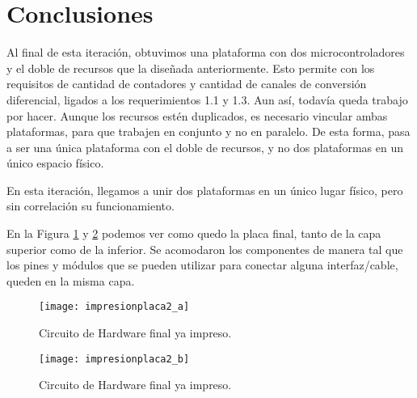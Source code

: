 
\section{Conclusiones} %
\label{it5:sec:conclusiones}


Al final de esta iteración, obtuvimos una plataforma con dos microcontroladores y el doble de recursos que la diseñada anteriormente. Esto permite con los requisitos de cantidad de contadores y cantidad de canales de conversión diferencial, ligados a los requerimientos 1.1 y 1.3.
Aun así, todavía queda trabajo por hacer. Aunque los recursos estén duplicados, es necesario vincular ambas plataformas, para que trabajen en conjunto y no en paralelo. De esta forma, pasa a ser una única plataforma con el doble de recursos, y no dos plataformas en un único espacio físico.

En esta iteración, llegamos a unir dos plataformas en un único lugar físico, pero sin correlación su funcionamiento.

En la Figura \ref{fig:impresionplaca2_a} y \ref{fig:impresionplaca2_b} podemos ver como quedo la placa final, tanto de la capa superior como de la inferior. Se acomodaron los componentes de manera tal que los pines y módulos que se pueden utilizar para conectar alguna interfaz/cable, queden en la misma capa.

\begin{figure}  
\centering
  \texttt{[image: impresionplaca2\_a]}
  \caption{Circuito de Hardware final ya impreso.}\label{fig:impresionplaca2_a}
\end{figure}

\begin{figure}  
\centering
  \texttt{[image: impresionplaca2\_b]}
  \caption{Circuito de Hardware final ya impreso.}\label{fig:impresionplaca2_b}
\end{figure}




